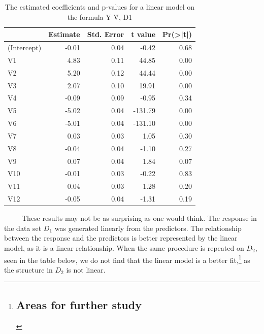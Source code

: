 \documentclass[12pt,twoside]{reedthesis}
\begin{document}
  \begin{table}
  
  \caption{\label{tab:unnamed-chunk-30}\label{tab:tablmD1}The estimated coefficients and p-values for a linear model on the formula Y \~ V, D1}
  \centering
  \begin{tabular}[t]{l|r|r|r|r}
  \hline
    & Estimate & Std. Error & t value & Pr(>|t|)\\
  \hline
  (Intercept) & -0.01 & 0.04 & -0.42 & 0.68\\
  \hline
  V1 & 4.83 & 0.11 & 44.85 & 0.00\\
  \hline
  V2 & 5.20 & 0.12 & 44.44 & 0.00\\
  \hline
  V3 & 2.07 & 0.10 & 19.91 & 0.00\\
  \hline
  V4 & -0.09 & 0.09 & -0.95 & 0.34\\
  \hline
  V5 & -5.02 & 0.04 & -131.79 & 0.00\\
  \hline
  V6 & -5.01 & 0.04 & -131.10 & 0.00\\
  \hline
  V7 & 0.03 & 0.03 & 1.05 & 0.30\\
  \hline
  V8 & -0.04 & 0.04 & -1.10 & 0.27\\
  \hline
  V9 & 0.07 & 0.04 & 1.84 & 0.07\\
  \hline
  V10 & -0.01 & 0.03 & -0.22 & 0.83\\
  \hline
  V11 & 0.04 & 0.03 & 1.28 & 0.20\\
  \hline
  V12 & -0.05 & 0.04 & -1.31 & 0.19\\
  \hline
  \end{tabular}
  \end{table}
  
  ~~~~~These results may not be as surprising as one would think. The
  response in the data set \(D_1\) was generated linearly from the
  predictors. The relationship between the response and the predictors is
  better represented by the linear model, as it is a linear relationship.
  When the same procedure is repeated on \(D_2\), seen in the table below,
  we do not find that the linear model is a better fit,\footnote{\subsection{Areas
    for further study}\label{areas-for-further-study}} as the structure in
  \(D_2\) is not linear.
  
\end{document}
